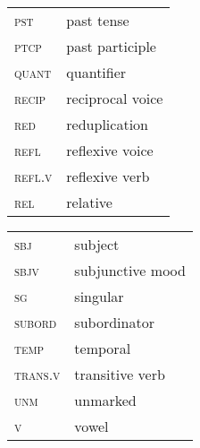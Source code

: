 \begin{tabularx}{.45\textwidth}{lQ}
\textsc{pst} & past tense\\
\textsc{ptcp} & past participle\\
\textsc{quant} & quantifier\\
\textsc{recip} & reciprocal voice\\
\textsc{red} & reduplication\\
\textsc{refl} & reflexive voice\\
\textsc{refl.v} & reflexive verb\\
\textsc{rel} & relative\\
\end{tabularx}
\begin{tabularx}{.45\textwidth}{lQ}
\textsc{sbj} & subject\\
\textsc{sbjv} & subjunctive mood\\
\textsc{sg} & singular\\
\textsc{subord}\footnotemark & subordinator\\
\textsc{temp} & temporal\\
\textsc{trans.v} & transitive verb\\
\textsc{unm} & unmarked\\
\textsc{v} & vowel\\
\end{tabularx}




